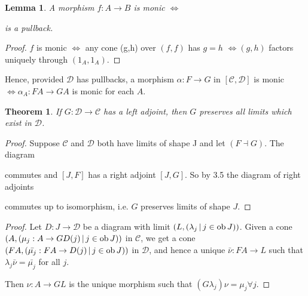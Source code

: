 \documentclass[a4paper]{article}
\newtheorem{lemma}[definition]{Lemma}
\newtheorem{theorem}[definition]{Theorem}
\numberwithin{definition}{section}
\newcommand*\ob[1]{\textnormal{ob}\,#1}
\begin{document}
\begin{lemma}
	A morphism $f: A \to B$ is monic $\iff$
	\begin{center}
	\end{center}
	is a pullback.
\end{lemma}
\begin{proof}
	$f$ is monic $\iff$ any cone (g,h) over $(f, f)$ has $g=h$
	$\iff (g, h)$ factors uniquely through $(1_A, 1_A)$.
\end{proof}

Hence, provided $\mathcal{D}$ has pullbacks,
a morphism $\alpha: F \to G$ in $[\mathcal{C}, \mathcal{D}]$
is monic $\iff \alpha_A: FA \to GA$ is monic for each $A$.

\begin{theorem}
	If $G: \mathcal{D} \to \mathcal{C}$ has a left adjoint,
	then $G$ preserves all limits which exist in $\mathcal{D}$.
	\label{410}
\end{theorem}
\begin{proof}
	Suppose $\mathcal{C}$ and $\mathcal{D}$ both have limits of shape J and let $(F \dashv G)$.
	The diagram
	\begin{center}
	\end{center}
	commutes and $[J, F]$ has a right adjoint $[J, G]$.
	So by 3.5 the diagram of right adjoints
	\begin{center}
	\end{center}
	commutes up to isomorphism,
	i.e. $G$ preserves limits of shape $J$.
\end{proof}
\begin{proof}
	Let $D:J \to \mathcal{D}$ be a diagram with limit $(L, (\lambda_j \,|\, j \in \ob J))$.
	Given a cone $(A, (\mu_j: A \to GD(j) \,|\, j \in \ob J))$ in $\mathcal{C}$,
	we get a cone $(FA, (\bar{\mu_j} : FA \to D(j) \,|\, j \in \ob J))$ in $\mathcal{D}$,
	and hence a unique $\bar{\nu}:FA \to L$ such that $\lambda_j\bar{\nu} = \bar{\mu_j}$ for all $j$.
	
	Then $\nu: A \to GL$ is the unique morphism such that $(G\lambda_j)\nu = \mu_j \forall j$.
\end{proof}
\end{document}
